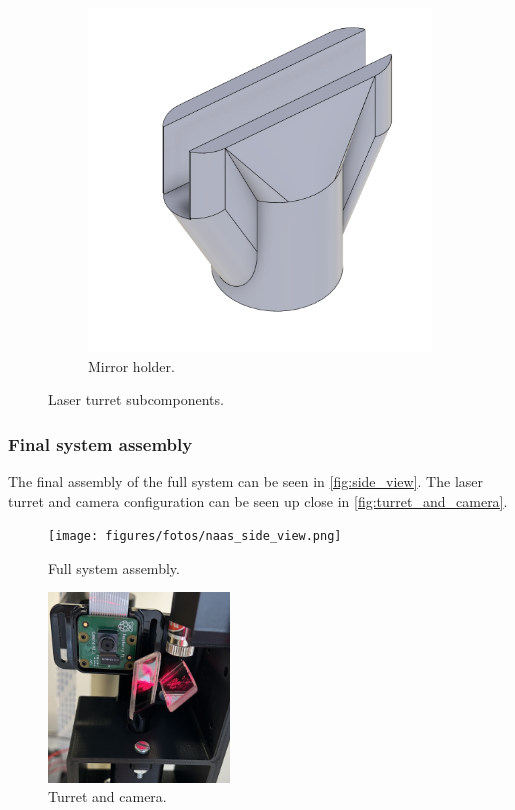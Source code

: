 \begin{figure}[!htb]
\begin{subfigure}{0.3\textwidth}
    \includegraphics[width=0.7\linewidth]{figures/hardware_design/mirror_holder.png}
    \caption{Mirror holder.}
  \end{subfigure}
  \caption{Laser turret subcomponents.}
  \label{fig:turret_subcomponents}
\end{figure}


\subsubsection{Final system assembly}
The final assembly of the full system can be seen in \autoref{fig:side_view}.
The laser turret and camera configuration can be seen up close in \autoref{fig:turret_and_camera}.
\begin{figure}[!htb]
  \centering
  \texttt{[image: figures/fotos/naas\_side\_view.png]}
  \caption{Full system assembly.}
  \label{fig:side_view}
\end{figure}
\begin{figure}[!htb]
  \centering
  \includegraphics[width=0.43\textwidth]{figures/fotos/turret_and_camera_cropped.jpg}
  \caption{Turret and camera.}
  \label{fig:turret_and_camera}
\end{figure}


